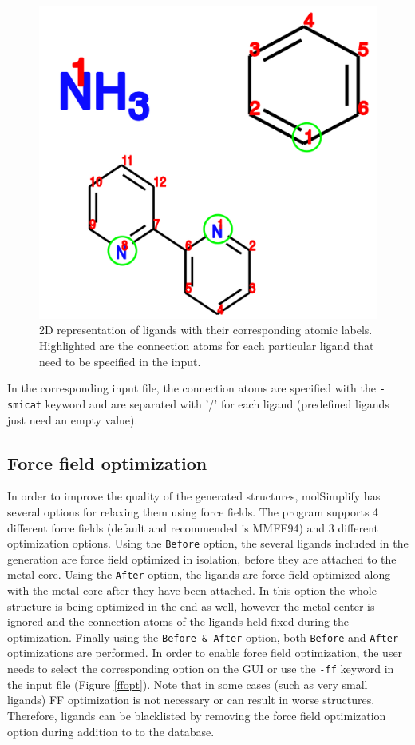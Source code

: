 \documentclass[a4paper,12pt]{assignment}
\begin{document}
\begin{figure}[htb!]
\centering
\includegraphics[scale=0.15]{./Figures/fig2b.png}
\caption{2D representation of ligands with their corresponding atomic labels. Highlighted are the connection atoms for each particular ligand that need to be specified in the input.}
\label{drawlig}
\end{figure}

In the corresponding input file, the connection atoms are specified with the \texttt{-smicat} keyword and are separated with '/' for each ligand (predefined ligands just need an empty value).


\subsection{Force field optimization}\label{sffopt}

In order to improve the quality of the generated structures, molSimplify has several options for relaxing them using force fields. The program supports 4 different force fields (default and recommended is MMFF94) and 3 different optimization options. Using the \texttt{Before} option, the several ligands included in the generation are force field optimized in isolation, before they are attached to the metal core. Using the \texttt{After} option, the ligands are force field optimized along with the metal core after they have been attached. In this option the whole structure is being optimized in the end as well, however the metal center is ignored and the connection atoms of the ligands held fixed during the optimization. Finally using the \texttt{Before \& After} option, both \texttt{Before} and \texttt{After} optimizations are performed. In order to enable force field optimization, the user needs to select the corresponding option on the GUI or use the \texttt{-ff} keyword in the input file (Figure \ref{ffopt}). Note that in some cases (such as very small ligands) FF optimization is not necessary or can result in worse structures. Therefore, ligands can be blacklisted by removing the force field optimization option during addition to to the database.
\end{document}
